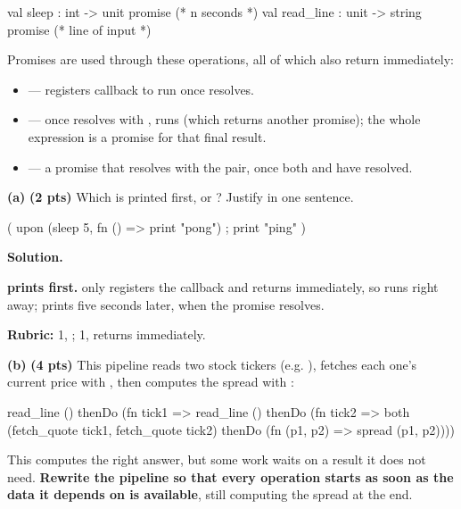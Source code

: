\documentclass[crop=false]{standalone}
\newif\ifsol
\newenvironment{solution}
    {\par\color{solution_color}\begin{framed}\textbf{Solution.}\par}
    {\end{framed}}
\newcommand{\subpts}[1]{\textbf{(#1 pts)}}
\newcommand{\answerspace}[1]{\ifsol\else\vspace{#1}\par\fi}
\begin{document}
\begin{codeblock}
  val sleep     : int -> unit promise      (* n seconds     *)
  val read_line : unit -> string promise   (* line of input *)
\end{codeblock}

Promises are used through these operations, all of which also return
immediately:

\begin{itemize}
  \item {} --- registers callback  to run once
     resolves.
  \item {} --- once  resolves with , runs
     (which returns another promise); the whole expression is a
    promise for that final result.
  \item {} --- a promise that resolves with the pair,
    once both  and  have resolved.
\end{itemize}

\textbf{(a)} \subpts{2} Which is printed first,  or
? Justify in one sentence.

\begin{codeblock}
  ( upon (sleep 5, fn () => print "pong")
  ; print "ping"
  )
\end{codeblock}

\answerspace{2.5cm}

\begin{solution}
\textbf{ prints first.}  only registers the
callback and returns immediately, so  runs right away;
 prints five seconds later, when the promise resolves.

\textbf{Rubric:} 1, ; 1,  returns immediately.
\end{solution}

\textbf{(b)} \subpts{4} This pipeline reads two stock tickers (e.g.
), fetches each one's current price with
, then computes the spread
with :

\begin{codeblock}
  read_line () thenDo (fn tick1 =>
  read_line () thenDo (fn tick2 =>
    both (fetch_quote tick1, fetch_quote tick2)
      thenDo (fn (p1, p2) => spread (p1, p2))))
\end{codeblock}

This computes the right answer, but some work waits on a result it does
not need. \textbf{Rewrite the pipeline so that every operation starts as
soon as the data it depends on is available}, still computing the spread
at the end.
\end{document}
